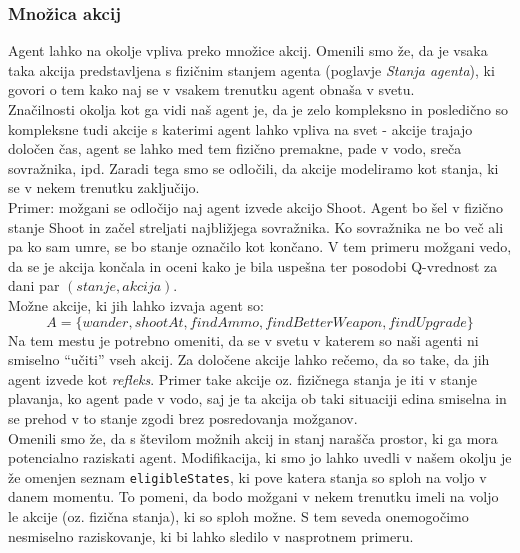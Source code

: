 \documentclass[a4paper,10pt]{article}
\begin{document}
\subsubsection{Množica akcij}
Agent lahko na okolje vpliva preko množice akcij. Omenili smo že, da je vsaka taka akcija predstavljena s fizičnim stanjem agenta (poglavje \textit{Stanja agenta}),
ki govori o tem kako naj se v vsakem trenutku agent obnaša v svetu.\\
Značilnosti okolja kot ga vidi naš agent je, da je zelo kompleksno in posledično so kompleksne tudi akcije s katerimi agent lahko vpliva na svet - akcije trajajo 
določen čas, agent se lahko med tem fizično premakne, pade v vodo, sreča sovražnika, ipd. Zaradi tega smo se odločili, da akcije modeliramo kot stanja, ki se v 
nekem trenutku zaključijo. \\
Primer: možgani se odločijo naj agent izvede akcijo Shoot. Agent bo šel v fizično stanje Shoot in začel streljati najbližjega sovražnika. Ko sovražnika ne bo 
več ali pa ko sam umre, se bo stanje označilo kot končano. V tem primeru možgani vedo, da se je akcija končala in oceni kako je bila uspešna ter posodobi 
Q-vrednost za dani par $(stanje, akcija)$.\\
Možne akcije, ki jih lahko izvaja agent so:
$$A = \{wander, shootAt, findAmmo, findBetterWeapon, findUpgrade\}$$
Na tem mestu je potrebno omeniti, da se v svetu v katerem so naši agenti ni smiselno ``učiti'' vseh akcij. Za določene akcije lahko rečemo, da so take, da jih
agent izvede kot \textit{refleks}. Primer take akcije oz. fizičnega stanja je iti v stanje plavanja, ko agent pade v vodo, saj je ta akcija ob taki situaciji 
edina smiselna in se prehod v to stanje zgodi brez posredovanja možganov.\\
Omenili smo že, da s številom možnih akcij in stanj narašča prostor, ki ga mora potencialno raziskati agent. Modifikacija, ki smo jo lahko uvedli v našem okolju
je že omenjen seznam \verb+eligibleStates+, ki pove katera stanja so sploh na voljo v danem momentu. To pomeni, da bodo možgani v nekem trenutku imeli
na voljo le akcije (oz. fizična stanja), ki so sploh možne. S tem seveda onemogočimo nesmiselno raziskovanje, ki bi lahko sledilo v nasprotnem primeru.
\end{document}
